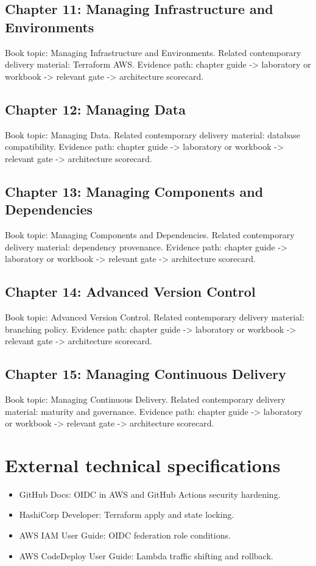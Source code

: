\documentclass[10pt,letterpaper]{article}
\begin{document}
\subsection{Chapter 11: Managing Infrastructure and Environments}
Book topic: Managing Infrastructure and Environments. Related contemporary delivery material: Terraform AWS. Evidence path: chapter guide -> laboratory or workbook -> relevant gate -> architecture scorecard.


\subsection{Chapter 12: Managing Data}
Book topic: Managing Data. Related contemporary delivery material: database compatibility. Evidence path: chapter guide -> laboratory or workbook -> relevant gate -> architecture scorecard.


\subsection{Chapter 13: Managing Components and Dependencies}
Book topic: Managing Components and Dependencies. Related contemporary delivery material: dependency provenance. Evidence path: chapter guide -> laboratory or workbook -> relevant gate -> architecture scorecard.


\subsection{Chapter 14: Advanced Version Control}
Book topic: Advanced Version Control. Related contemporary delivery material: branching policy. Evidence path: chapter guide -> laboratory or workbook -> relevant gate -> architecture scorecard.


\subsection{Chapter 15: Managing Continuous Delivery}
Book topic: Managing Continuous Delivery. Related contemporary delivery material: maturity and governance. Evidence path: chapter guide -> laboratory or workbook -> relevant gate -> architecture scorecard.


\section{External technical specifications}
\begin{itemize}
\item GitHub Docs: OIDC in AWS and GitHub Actions security hardening.
\item HashiCorp Developer: Terraform apply and state locking.
\item AWS IAM User Guide: OIDC federation role conditions.
\item AWS CodeDeploy User Guide: Lambda traffic shifting and rollback.
\end{itemize}
\end{document}
